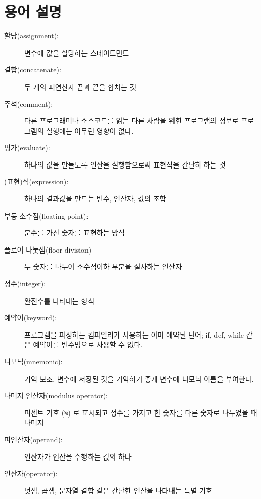 \section{용어 설명}

\begin{description}

\item[할당(assignment):] 변수에 값을 할당하는 스테이트먼트

\item[결합(concatenate):] 두 개의 피연산자 끝과 끝을 합치는 것

\item[주석(comment):] 다른 프로그래머나 소스코드를 읽는 다른 사람을 위한 프로그램의 정보로 프로그램의 실행에는 아무런 영향이 없다.

\item[평가(evaluate):] 하나의 값을 만들도록 연산을 실행함으로써 표현식을 간단히 하는 것

\item[(표현)식(expression):] 하나의 결과값을 만드는 변수, 연산자, 값의 조합

\item[부동 소수점(floating-point):] 분수를 가진 숫자를 표현하는 방식

\item[플로어 나눗셈(floor division)] 두 숫자를 나누어 소수점이하 부분을 절사하는 연산자

\item[정수(integer):] 완전수를 나타내는 형식

\item[예약어(keyword):]  프로그램을 파싱하는 컴파일러가 사용하는 이미 예약된 단어; if, def, while 같은 예약어를 변수명으로 사용할 수 없다.

\item[니모닉(mnemonic):] 기억 보조, 변수에 저장된 것을 기억하기 좋게 변수에 니모닉 이름을 부여한다.

\item[나머지 연산자(modulus operator):] 
퍼센트 기호 ({\tt \%}) 로 표시되고 정수를 가지고 한 숫자를 다른 숫자로 나누었을 때 나머지

\item[피연산자(operand):]  연산자가 연산을 수행하는 값의 하나

\item[연산자(operator):] 덧셈, 곱셈, 문자열 결합 같은 간단한 연산을 나타내는 특별 기호


\end{description}
